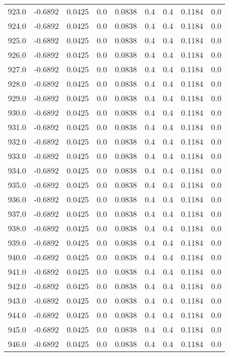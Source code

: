 \begin{longtable}{lrrrrrrrr}
923.0 & -0.6892 & 0.0425 & 0.0 & 0.0838 & 0.4 & 0.4 & 0.1184 & 0.0 \\
924.0 & -0.6892 & 0.0425 & 0.0 & 0.0838 & 0.4 & 0.4 & 0.1184 & 0.0 \\
925.0 & -0.6892 & 0.0425 & 0.0 & 0.0838 & 0.4 & 0.4 & 0.1184 & 0.0 \\
926.0 & -0.6892 & 0.0425 & 0.0 & 0.0838 & 0.4 & 0.4 & 0.1184 & 0.0 \\
927.0 & -0.6892 & 0.0425 & 0.0 & 0.0838 & 0.4 & 0.4 & 0.1184 & 0.0 \\
928.0 & -0.6892 & 0.0425 & 0.0 & 0.0838 & 0.4 & 0.4 & 0.1184 & 0.0 \\
929.0 & -0.6892 & 0.0425 & 0.0 & 0.0838 & 0.4 & 0.4 & 0.1184 & 0.0 \\
930.0 & -0.6892 & 0.0425 & 0.0 & 0.0838 & 0.4 & 0.4 & 0.1184 & 0.0 \\
931.0 & -0.6892 & 0.0425 & 0.0 & 0.0838 & 0.4 & 0.4 & 0.1184 & 0.0 \\
932.0 & -0.6892 & 0.0425 & 0.0 & 0.0838 & 0.4 & 0.4 & 0.1184 & 0.0 \\
933.0 & -0.6892 & 0.0425 & 0.0 & 0.0838 & 0.4 & 0.4 & 0.1184 & 0.0 \\
934.0 & -0.6892 & 0.0425 & 0.0 & 0.0838 & 0.4 & 0.4 & 0.1184 & 0.0 \\
935.0 & -0.6892 & 0.0425 & 0.0 & 0.0838 & 0.4 & 0.4 & 0.1184 & 0.0 \\
936.0 & -0.6892 & 0.0425 & 0.0 & 0.0838 & 0.4 & 0.4 & 0.1184 & 0.0 \\
937.0 & -0.6892 & 0.0425 & 0.0 & 0.0838 & 0.4 & 0.4 & 0.1184 & 0.0 \\
938.0 & -0.6892 & 0.0425 & 0.0 & 0.0838 & 0.4 & 0.4 & 0.1184 & 0.0 \\
939.0 & -0.6892 & 0.0425 & 0.0 & 0.0838 & 0.4 & 0.4 & 0.1184 & 0.0 \\
940.0 & -0.6892 & 0.0425 & 0.0 & 0.0838 & 0.4 & 0.4 & 0.1184 & 0.0 \\
941.0 & -0.6892 & 0.0425 & 0.0 & 0.0838 & 0.4 & 0.4 & 0.1184 & 0.0 \\
942.0 & -0.6892 & 0.0425 & 0.0 & 0.0838 & 0.4 & 0.4 & 0.1184 & 0.0 \\
943.0 & -0.6892 & 0.0425 & 0.0 & 0.0838 & 0.4 & 0.4 & 0.1184 & 0.0 \\
944.0 & -0.6892 & 0.0425 & 0.0 & 0.0838 & 0.4 & 0.4 & 0.1184 & 0.0 \\
945.0 & -0.6892 & 0.0425 & 0.0 & 0.0838 & 0.4 & 0.4 & 0.1184 & 0.0 \\
946.0 & -0.6892 & 0.0425 & 0.0 & 0.0838 & 0.4 & 0.4 & 0.1184 & 0.0 \\

\end{longtable}
